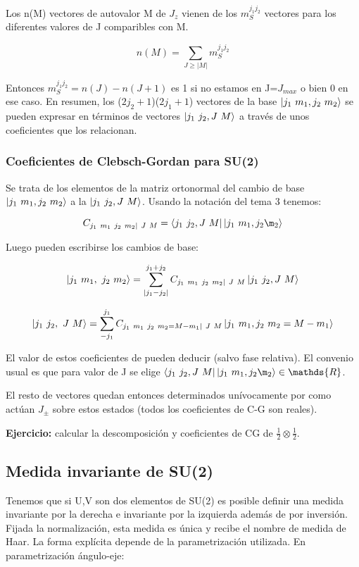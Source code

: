 \documentclass{article}
\begin{document}
        \smallskip
        Los n(M) vectores de autovalor M de $J_z$ vienen de los $m_S^{j_1j_2}$ vectores para los diferentes valores de J comparibles con M.

        $$n(M)= \sum _{J\geq |M|}m_S^{j_1j_2}$$

        Entonces $m_S^{j_1j_2} = n(J)-n(J+1)$ es 1 si no estamos en J=$J_{max}$ o bien 0 en ese caso. En resumen, los ($2j_2 + 1$)($2j_1+1$) vectores de la base $\ket{j_1 \ m_1,j_2 \ m_2}$ se pueden expresar en términos de vectores $\ket{j_1 \ j_2, J \ M}$ a través de unos coeficientes que los relacionan.

        \subsubsection{Coeficientes de Clebsch-Gordan para SU(2)}

        Se trata de los elementos de la matriz ortonormal del cambio de base $\ket{j_1 \ m_1,j_2 \ m_2}$ a la $\ket{j_1 \ j_2, J \ M}$. Usando la notación del tema 3 tenemos:

        $$C_{j_1 \ m_1 \ j_2 \ m_2 | \ J \ M}=\bra{j_1 \ j_2 , J \ M}\ket{j_1 \ m_1, j_2 \m_2}$$

        Luego pueden escribirse los cambios de base:

        $$\ket{j_1 \ m_1, \ j_2 \ m_2}=\sum _{|j_1-j_2|}^{j_1+j_2} C_{j_1 \ m_1 \ j_2 \ m_2 | \ J \ M} \ket{j_1 \ j_2 , J \ M}$$

        $$\ket{j_1 \ j_2, \ J \ M}=\sum _{-j_1}^{j_1} C_{j_1 \ m_1 \ j_2 \ m_2=M-m_1 | \ J \ M} \ket{j_1 \ m_1 , j_2 \ m_2=M-m_1}$$

        El valor de estos coeficientes de pueden deducir (salvo fase relativa). El convenio usual es que para valor de J se elige $\bra{j_1 \ j_2 , J \ M}\ket{j_1 \ m_1, j_2 \m_2} \in \mathds{R}$.

        El resto de vectores quedan entonces determinados unívocamente por como actúan $J_\pm$ sobre estos estados (todos los coeficientes de C-G son reales).

        \textbf{Ejercicio:} calcular la descomposición y coeficientes de CG de $\frac{1}{2}\otimes \frac{1}{2}$.

        \subsection{Medida invariante de SU(2)}

        Tenemos que si U,V son dos elementos de SU(2) es posible definir una medida invariante por la derecha e invariante por la izquierda además de por inversión. Fijada la normalización, esta medida es única y recibe el nombre de medida de Haar. La forma explícita depende de la parametrización utilizada. En parametrización ángulo-eje:
\end{document}

